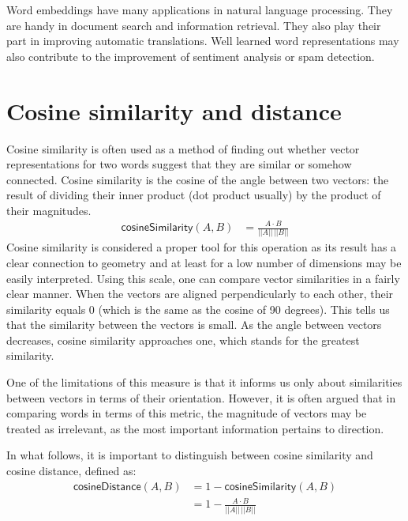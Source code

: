 \documentclass[
  12pt,
]{book}
\begin{document}
Word embeddings have many applications in natural language processing. They are handy in document search and information retrieval. They also play their part in improving automatic translations. Well learned word representations may also contribute to the improvement of sentiment analysis or spam detection.

\hypertarget{cosine-similarity-and-distance}{%
\section{Cosine similarity and distance}\label{cosine-similarity-and-distance}}

Cosine similarity is often used as a method of finding out whether vector representations for two words suggest that they are similar or somehow connected. Cosine similarity is the cosine of the angle between two vectors: the result of dividing their inner product (dot product usually) by the product of their magnitudes.
\begin{align} \tag{Sim}
\mathsf{cosineSimilarity}(A,B) & = \frac{A \cdot B}{\vert \vert A \vert \vert \,\vert \vert B \vert \vert}
\end{align}
Cosine similarity is considered a proper tool for this operation as its result has a clear connection to geometry and at least for a low number of dimensions may be easily interpreted. Using this scale, one can compare vector similarities in a fairly clear manner. When the vectors are aligned perpendicularly to each other, their similarity equals 0 (which is the same as the cosine of 90 degrees). This tells us that the similarity between the vectors is small. As the angle between vectors decreases, cosine similarity approaches one, which stands for the greatest similarity.

One of the limitations of this measure is that it informs us only about similarities between vectors in terms of their orientation. However, it is often argued that in comparing words in terms of this metric, the magnitude of vectors may be treated as irrelevant, as the most important information pertains to direction.

In what follows, it is important to distinguish between cosine similarity and cosine distance, defined as:
\begin{align} \tag{Sim}
\mathsf{cosineDistance}(A,B) &  = 1 - \mathsf{cosineSimilarity}(A,B)\\
 &  = 1 - \frac{A \cdot B}{\vert \vert A \vert \vert \,\vert \vert B \vert \vert} \nonumber
\end{align}
\end{document}

